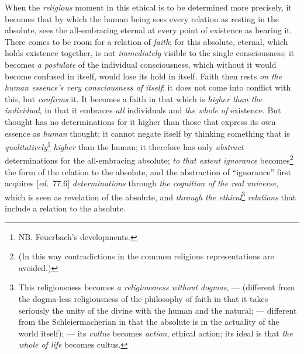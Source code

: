 \documentclass[12pt,a4paper,openany]{book}
\newcommand{\kpage}[1]{\marginnote{\footnotesize\textit{[#1]}}}
\newcommand{\ed}[1]{{\small[\textit{ed.}\ #1]}}
\begin{document}
When the \emph{religious} moment in this ethical is to be determined more precisely,
it becomes that by which the human being sees every relation as
resting in the absolute, sees the all-embracing eternal at every
point of existence as bearing it. There comes to be room for a relation of \emph{faith};
for this absolute, eternal, which holds existence together,
is not \emph{immediately} visible to the single consciousness; it becomes \emph{a
postulate} of the individual consciousness, which without it would become confused in
itself, would lose its hold in itself. Faith then rests \emph{on the human
essence's very consciousness of itself}; it does not come into conflict with
this, but \emph{confirms} it. It becomes a faith in that which is \emph{higher than
the individual}, in that it embraces \emph{all} individuals and \emph{the whole of} existence. But
thought has no determinations for it higher than those that express
its own essence as \emph{human} thought; it cannot negate itself
by thinking something that is \emph{qualitatively}\footnote[146]{NB. Feuerbach's developments.}
\emph{higher} than the human\kpage{185};
it therefore has only \emph{abstract} determinations for the all-embracing absolute;
\emph{to that extent} \emph{ignorance} becomes\footnote[147]{(In this way contradictions in the common religious representations are avoided.)}
the form of the relation
to the absolute, and the abstraction of ``ignorance'' first acquires \ed{77.6}
\emph{determinations} through \emph{the cognition of the real universe}, which is seen
as revelation of the absolute, and \emph{through the ethical}\footnote[148]{This religiousness becomes \emph{a religiousness without dogmas}, --- (different from the dogma-less
religiousness of the philosophy of faith in that it takes seriously the unity of the divine
with the human and the natural; --- different from the Schleiermacherian
in that the absolute is in the actuality of the world itself); --- its \emph{cultus} becomes \emph{action},
ethical action; its ideal is that \emph{the whole of life} becomes cultus.}
\emph{relations} that
include a relation to the absolute.
\end{document}
